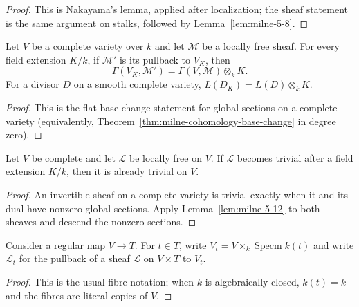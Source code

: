 \begin{proof}

This is Nakayama's lemma, applied after localization; the sheaf statement is
the same argument on stalks, followed by Lemma~\ref{lem:milne-5-8}.

\end{proof}


\begin{lemma}
\label{lem:milne-5-12}

Let $V$ be a complete variety over $k$ and let $\mathcal M$ be a locally free
sheaf.  For every field extension $K/k$, if $\mathcal M'$ is its pullback to
$V_K$, then
\[
\Gamma(V_K,\mathcal M')=\Gamma(V,\mathcal M)\otimes_kK.
\]
For a divisor $D$ on a smooth complete variety,
$L(D_K)=L(D)\otimes_kK$.
\end{lemma}

\begin{proof}

This is the flat base-change statement for global sections on a complete
variety (equivalently, Theorem~\ref{thm:milne-cohomology-base-change} in
degree zero).

\end{proof}


\begin{lemma}
\label{lem:milne-5-13}

Let $V$ be complete and let $\mathcal L$ be locally free on $V$.  If
$\mathcal L$ becomes trivial after a field extension $K/k$, then it is
already trivial on $V$.
\end{lemma}

\begin{proof}
An invertible sheaf on a complete variety is trivial exactly when it and its
dual have nonzero global sections.  Apply Lemma~\ref{lem:milne-5-12} to
both sheaves and descend the nonzero sections.
\end{proof}

\begin{lemma}
\label{lem:milne-5-14}

Consider a regular map $V\to T$.  For $t\in T$, write
$V_t=V\times_k\operatorname{Specm}k(t)$ and write $\mathcal L_t$ for the
pullback of a sheaf $\mathcal L$ on $V\times T$ to $V_t$.
\end{lemma}

\begin{proof}

This is the usual fibre notation; when $k$ is algebraically closed,
$k(t)=k$ and the fibres are literal copies of $V$.

\end{proof}


